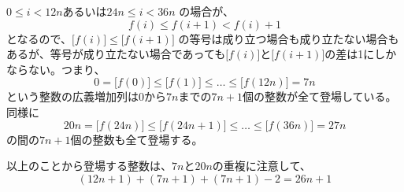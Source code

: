 $0\le i < 12n$あるいは$24n\le i < 36n$ の場合が、
\[ f(i) \le f(i+1) < f(i)+1 \]
となるので、$\bigl[f(i)\bigr]\le \bigl[f(i+1)\bigr]$ の等号は成り立つ場合も成り立たない場合もあるが、等号が成り立たない場合であっても$\bigl[f(i)\bigr]$と$\bigl[f(i+1)\bigr]$の差は1にしかならない。つまり、
\[ 0=\bigl[f(0)\bigr]\le\bigl[f(1)\bigr]\le\dots\le\bigl[f(12n)\bigr]=7n \]
という整数の広義増加列は$0$から$7n$までの$7n+1$個の整数が全て登場している。同様に
\[ 20n=\bigl[f(24n)\bigr]\le\bigl[f(24n+1)\bigr]\le\dots\le\bigl[f(36n)\bigr]=27n \]
の間の$7n+1$個の整数も全て登場する。

以上のことから登場する整数は、$7n$と$20n$の重複に注意して、
\[ (12n+1)+(7n+1)+(7n+1)-2=26n+1 \]
